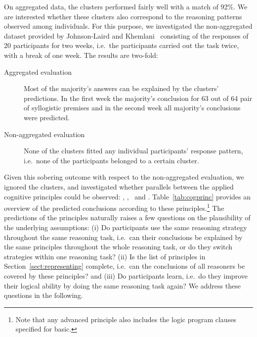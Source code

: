 \documentclass[12pt]{article}
\begin{document}
On aggregated data, the clusters performed fairly well with a match of 92\;\%. 
We are interested whether these clusters also correspond to the reasoning patterns observed among individuals. 
For this purpose, we investigated the non-aggregated dataset provided by Johnson-Laird and Khemlani~\cite{khemlani:2016} consisting of the responses of 20 participants for two weeks,
i.e.\ the participants carried out the task twice, with a break of one week. 
The results are two-fold:
\begin{description}
 \item[Aggregated evaluation] Most of the majority's answers can be explained by the clusters' predictions. In the first week 
 the majority's conclusion for 63 out of 64 pair of syllogistic premises and in the second week
 all majority's conclusions were predicted.
\item[Non-aggregated evaluation] None of the clusters fitted any individual participants' response pattern, i.e.\ none of the participants belonged to a certain cluster.
\end{description}



Given this sobering outcome with respect to the non-aggregated evaluation, 
we ignored the clusters, and investigated whether parallels between the applied cognitive principles could be observed: \basic, \contraposition, \abduction\ and \negFailure.
Table~\ref{tab:cogprinc} provides an overview of the predicted conclusions according to these principles.\footnote{Note that any advanced principle also includes the logic program clauses specified for \textsf{basic}.}
The predictions of the principles naturally raises a few questions on the plausibility of 
the underlying assumptions:
(i) Do participants use the same reasoning strategy throughout the same reasoning task, i.e.\ 
can their conclusions be 
explained by  the same principles throughout the whole reasoning task, or do they switch strategies within one reasoning task?
(ii) Is the list of principles in Section~\ref{sect:representing} complete, i.e.\ can the conclusions of all reasoners be covered
 by these principles? and
(iii) Do participants learn, i.e.\ do they improve their logical ability by doing the same reasoning task again?
We address these questions in the following.
\end{document}
